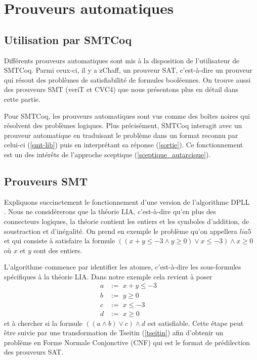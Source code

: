 \documentclass[11pt]{article}
\begin{document}
\newpage
\section{Prouveurs automatiques} \label{fonctionnement_prouveurs}

\subsection{Utilisation par SMTCoq}

Différents prouveurs automatiques sont mis à la disposition de l'utilisateur de SMTCoq. Parmi ceux-ci, il y a zChaff, un prouveur SAT, c'est-à-dire un prouveur qui résout des problèmes de satisfiabilité de formules booléennes. On trouve aussi des prouveurs SMT (veriT et CVC4) que nous présentons plus en détail dans cette partie.\medbreak 

Pour SMTCoq, les prouveurs automatiques sont vus comme des boîtes noires qui résolvent des problèmes logiques. Plus précisément, SMTCoq interagit avec un prouveur automatique en traduisant le problème dans un format reconnu par celui-ci (\ref{smt-lib}) puis en interprétant sa réponse (\ref{sortie}). Ce fonctionnement est un des intérêts de l'approche sceptique (\ref{sceptique_autarcique}).

\subsection{Prouveurs SMT} \label{smt}

Expliquons succinctement le fonctionnement d'une version de l'algorithme DPLL \cite{dpll}. Nous ne considérerons que la théorie LIA, c'est-à-dire qu'en plus des connecteurs logiques, la théorie contient les entiers et les symboles d'addition, de soustraction et d'inégalité. On prend en exemple le problème qu'on appellera $lia5$ et qui consiste à satisfaire la formule $((x + y \leq -3 \wedge y \geq 0) \vee x \leq -3) \wedge x \geq 0$ où $x$ et $y$ sont des entiers. \medbreak

L'algorithme commence par identifier les atomes, c'est-à-dire les sous-formules spécifiques à la théorie LIA. Dans notre exemple cela revient à poser 
\begin{align*}
a &:= \,\, x + y \leq -3 \\
b &:=\,\, y \geq 0 \\
c &:= \,\,x \leq -3 \\
d &:= \,\,x \geq 0
\end{align*}
et à chercher si la formule  $((a \wedge b) \vee c) \wedge d$ est satisfiable. Cette étape peut être suivie par une transformation de Tseitin (\ref{tseitin}) afin d'obtenir un problème en Forme Normale Conjonctive (CNF) qui est le format de prédilection des prouveurs SAT. \medbreak
\end{document}
